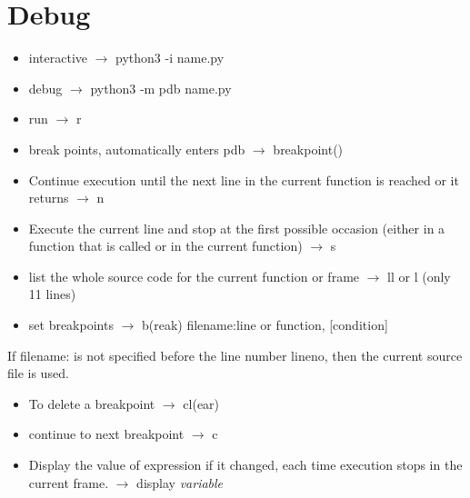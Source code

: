 \documentclass{article}
\begin{document}
\section{Debug}

\begin{itemize}
\item interactive $\rightarrow$ python3 -i name.py
\item debug $\rightarrow$ python3 -m pdb name.py \cite{pdb}
\item run $\rightarrow$ r
\item break points, automatically enters pdb $\rightarrow$  breakpoint()
\item Continue execution until the next line in the current function is reached or it returns $\rightarrow$ n
\item Execute the current line and stop at the first possible occasion (either in a function that is called or in the current function)  $\rightarrow$ s
\item list the whole source code for the current function or frame $\rightarrow$ ll  or l (only 11 lines)
\item set breakpoints $\rightarrow$ b(reak) filename:line or function, [condition]
\end{itemize}
If filename: is not specified before the line number lineno, then the current source file is used.
\begin{itemize}
\item To delete a breakpoint $\rightarrow$ cl(ear)
\item continue to next breakpoint $\rightarrow$ c
\item Display the value of expression if it changed, each time execution stops in the current frame. $\rightarrow$  display \textit{variable}
\end{itemize}
\end{document}
